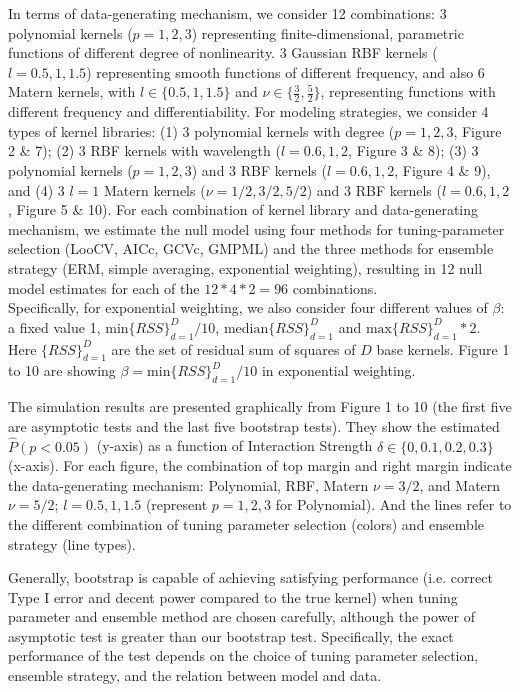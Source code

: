 \documentclass[article]{jss}
\begin{document}
In terms of data-generating mechanism, we consider 12 combinations: 3 polynomial kernels ($p=1, 2, 3$) representing finite-dimensional, parametric functions of different degree of nonlinearity. 3 Gaussian RBF kernels ($l=0.5, 1, 1.5$) representing smooth functions of different frequency, and also 6 Matern kernels, with $l \in \{0.5, 1, 1.5\}$ and $\nu \in \{\frac{3}{2}, \frac{5}{2}\}$, representing functions with different frequency and differentiability. For modeling strategies, we consider 4 types of kernel libraries: (1) 3 polynomial kernels with degree ($p=1, 2, 3$, Figure 2 \& 7); (2) 3 RBF kernels with wavelength ($l=0.6, 1, 2$, Figure 3 \& 8); (3) 3 polynomial kernels ($p=1, 2, 3$) and 3 RBF kernels ($l=0.6, 1, 2$, Figure 4 \& 9), and (4) 3 $l=1$ Matern kernels ($\nu=1/2, 3/2, 5/2$) and 3 RBF kernels ($l=0.6, 1, 2$, Figure 5 \& 10). For each combination of kernel library and data-generating mechanism, we estimate the null model using four methods for tuning-parameter selection (LooCV, AICc, GCVc, GMPML) and the three methods for ensemble strategy (ERM, simple averaging, exponential weighting), resulting in 12 null model estimates for each of the $12 * 4 * 2 = 96$ combinations.\\

Specifically, for exponential weighting, we also consider four different values of $\beta$: a fixed value 1, $\mbox{min}\{RSS\} _{d=1}^D/10$, $\mbox{median}\{RSS\} _{d=1}^D$ and $\mbox{max}\{RSS\} _{d=1}^D * 2$. Here $\{RSS\} _{d=1}^D$ are the set of residual sum of squares of $D$ base kernels. Figure 1 to 10 are showing $\beta = \mbox{min}\{RSS\} _{d=1}^D/10$ in exponential weighting.

The simulation results are presented graphically from Figure 1 to 10 (the first five are asymptotic tests and the last five bootstrap tests). They show the estimated $\hat{P}(p<0.05)$ (y-axis) as a function of Interaction Strength $\delta \in \{0, 0.1, 0.2, 0.3\}$ (x-axis). For each figure, the combination of top margin and right margin indicate the data-generating mechanism: Polynomial, RBF, Matern $\nu=3/2$, and Matern $\nu=5/2$; $l=0.5, 1, 1.5$ (represent $p=1, 2, 3$ for Polynomial). And the lines refer to the different combination of tuning parameter selection (colors) and ensemble strategy (line types).

Generally, bootstrap is capable of achieving satisfying performance (i.e. correct Type I error and decent power compared to the true kernel) when tuning parameter and ensemble method are chosen carefully, although the power of asymptotic test is greater than our bootstrap test. Specifically, the exact performance of the test depends on the choice of tuning parameter selection, ensemble strategy, and the relation between model and data.
\end{document}
